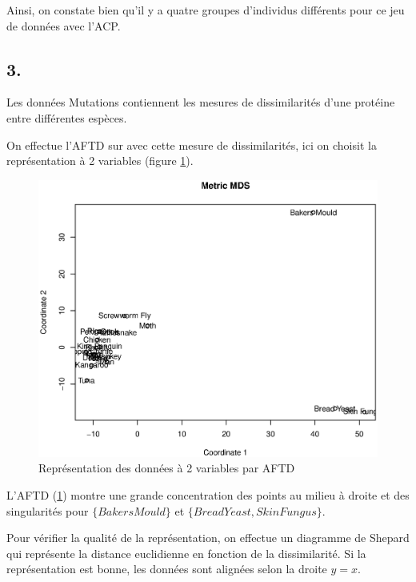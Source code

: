 \documentclass{article}
\begin{document}
Ainsi, on constate bien qu'il y a quatre groupes d'individus différents pour ce jeu de données avec l'ACP.

\subsection*{3.}

Les données Mutations contiennent les mesures de dissimilarités d'une protéine entre différentes espèces.

On effectue l'AFTD sur avec cette mesure de dissimilarités, ici on choisit la représentation à 2 variables (figure \ref{mut_aftd}).

\begin{figure}[H]
\centering
\includegraphics[scale=0.5]{./img/mut_aftd.eps}
\caption{Représentation des données à 2 variables par AFTD}
\label{mut_aftd}
\end{figure}

L'AFTD (\ref{mut_aftd}) montre une grande concentration des points au milieu à droite et des singularités pour $\lbrace Bakers Mould\rbrace$ et $\lbrace Bread Yeast, Skin Fungus\rbrace$.

Pour vérifier la qualité de la représentation, on effectue un diagramme de Shepard qui représente la distance euclidienne en fonction de la dissimilarité. Si la représentation est bonne, les données sont alignées selon la droite $y=x$.
\end{document}
